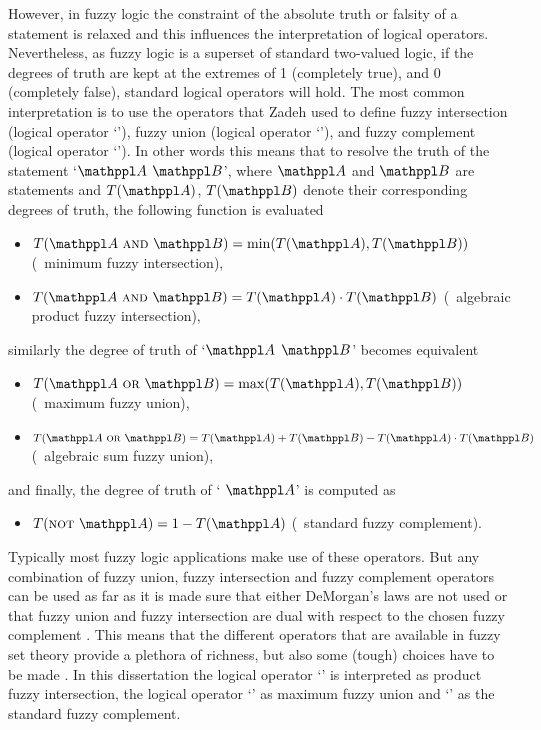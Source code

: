 However, in fuzzy logic the constraint of the absolute truth or falsity of a statement is relaxed and this influences the interpretation of logical operators. Nevertheless, as fuzzy logic is a superset of standard two-valued logic, if the degrees of truth are kept at the extremes of 1 (completely true), and 0 (completely false), standard logical operators will hold. The most common interpretation is to use the operators that Zadeh \cite{zadeh:1965} used to define fuzzy intersection (logical operator `'), fuzzy union (logical operator `'), and fuzzy complement (logical operator `'). In other words this means that to resolve the truth of the statement `$\statement{A}$  $\statement{B}$', where $\statement{A}$ and $\statement{B}$ are statements and $T(\statement{A})$, $T(\statement{B})$ denote their corresponding degrees of truth, the following function is evaluated
%
\begin{itemize}
 \item $T(\statement{A}\ \kwd{and}\ \statement{B})=\min(T(\statement{A}),T(\statement{B}))$ (\ie\ minimum fuzzy intersection),
 \item $T(\statement{A}\ \kwd{and}\ \statement{B})=T(\statement{A}) \cdot T(\statement{B})$ (\ie\ algebraic product fuzzy intersection),
\end{itemize}
%
similarly the degree of truth of `$\statement{A}$  $\statement{B}$' becomes equivalent 
%
\begin{itemize}
\item $T(\statement{A}\ \kwd{or}\ \statement{B})=\max(T(\statement{A}),T(\statement{B}))$ (\ie\ maximum fuzzy union),
\item $T(\statement{A}\ \kwd{or}\ \statement{B})=T(\statement{A}) + T(\statement{B}) - T(\statement{A}) \cdot T(\statement{B})$ (\ie\ algebraic sum fuzzy union),
\end{itemize}
%
and finally, the degree of truth of ` $\statement{A}$' is computed as 
%
\begin{itemize}
\item $T(\kwd{not}\ \statement{A})=1 - T(\statement{A})$ (\ie\ standard fuzzy complement).
\end{itemize}

Typically most fuzzy logic applications make use of these operators. But any combination of fuzzy union, fuzzy intersection and fuzzy complement operators can be used as far as it is made sure that either DeMorgan's laws are not used or that fuzzy union and fuzzy intersection are dual with respect to the chosen fuzzy complement \cite{klir:1995}. This means that the different operators that are available in fuzzy set theory provide a plethora of richness, but also some (tough) choices have to be made \cite{mendel:2001}. In this dissertation the logical operator `' is interpreted as product fuzzy intersection, the logical operator `' as maximum fuzzy union and `' as the standard fuzzy complement.

